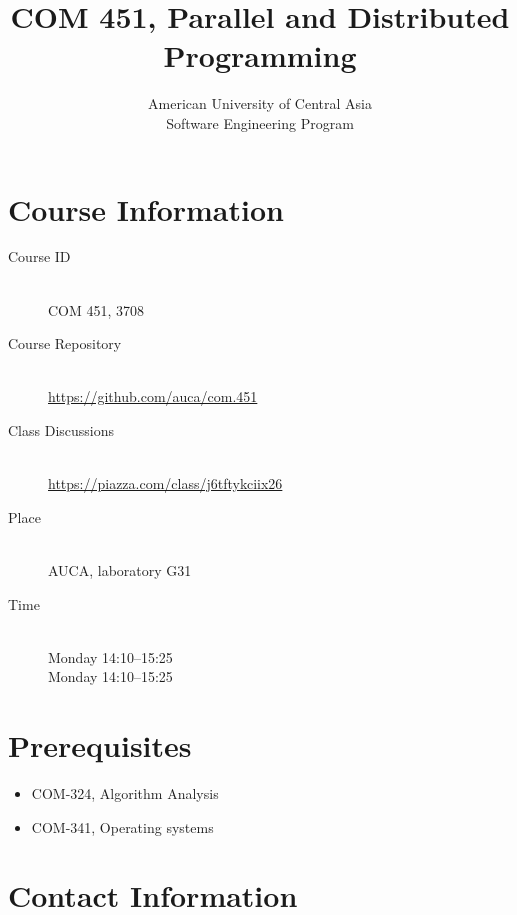 \documentclass[12pt,a4paper,oneside]{article}
\begin{document}
    \title{COM 451, Parallel and Distributed Programming}
    \author{
        American University of Central Asia\\
        Software Engineering Program
    }
    \date{}
    \maketitle

    \section{Course Information}

        \begin{description}
            \item[Course ID]\hfill\\
                COM 451, 3708
            \item[Course Repository]\hfill\\
                \url{https://github.com/auca/com.451}
            \item[Class Discussions]\hfill\\
                \url{https://piazza.com/class/j6tftykciix26}
            \item[Place]\hfill\\
                AUCA, laboratory G31
            \item[Time]\hfill\\
                Monday 14:10--15:25\\
                Monday 14:10--15:25
        \end{description}

    \section{Prerequisites}

        \begin{itemize}
            \item COM-324, Algorithm Analysis
            \item COM-341, Operating systems
        \end{itemize}

    \section{Contact Information}
\end{document}
